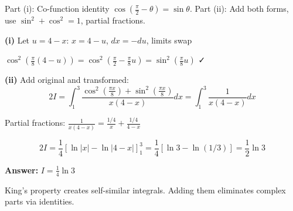 \begin{hint}
Part (i): Co-function identity $\cos(\frac{\pi}{2}-\theta) = \sin\theta$. Part (ii): Add both forms, use $\sin^2+\cos^2=1$, partial fractions.
\end{hint}

\begin{solution}
\textbf{(i)} Let $u=4-x$: $x=4-u$, $dx=-du$, limits swap

$\cos^2(\frac{\pi}{8}(4-u)) = \cos^2(\frac{\pi}{2}-\frac{\pi}{8}u) = \sin^2(\frac{\pi}{8}u)$ ✓

\textbf{(ii)} Add original and transformed:
\[
2I = \int_1^3 \frac{\cos^2(\frac{\pi x}{8}) + \sin^2(\frac{\pi x}{8})}{x(4-x)} dx = \int_1^3 \frac{1}{x(4-x)} dx
\]

Partial fractions: $\frac{1}{x(4-x)} = \frac{1/4}{x} + \frac{1/4}{4-x}$

\[
2I = \frac{1}{4}[\ln|x| - \ln|4-x|]_1^3 = \frac{1}{4}[\ln 3 - \ln(1/3)] = \frac{1}{2}\ln 3
\]

\textbf{Answer:} $\boxed{I = \frac{1}{4}\ln 3}$
\end{solution}

\begin{takeaways}
King's property creates self-similar integrals. Adding them eliminates complex parts via identities.
\end{takeaways}

